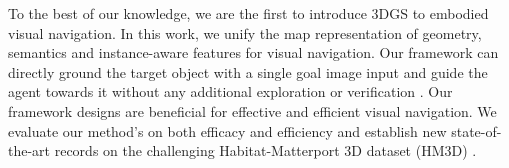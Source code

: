 To the best of our knowledge, we are the first to introduce 3DGS \cite{kerbl3Dgaussians} to embodied visual navigation. In this work, we unify the map representation of geometry, semantics and instance-aware features for visual navigation. Our framework can directly ground the target object with a single goal image input and guide the agent towards it without any additional exploration or verification \cite{lei2024instanceaware}. Our framework designs are beneficial for effective and efficient visual navigation. We evaluate our method's on both efficacy and efficiency and establish new state-of-the-art records on the challenging Habitat-Matterport 3D dataset (HM3D) \cite{yadav2023habitat}.








